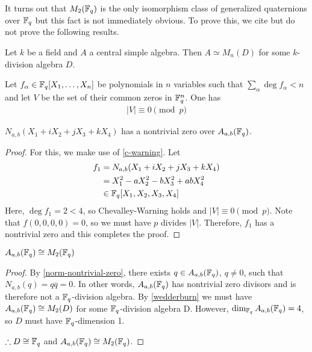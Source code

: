 \documentclass{amsart}
\begin{document}
It turns out that $M_2(\protect\mathbb{F}_q)$ is the only isomorphism class of generalized quaternions over $\protect\mathbb{F}_q$ but this fact is not immediately obvious. To prove this, we cite but do not prove the following results. 

\begin{theorem}\label{wedderburn}
    Let $k$ be a field and $A$ a central simple algebra. Then $A \simeq M_n(D)$ for some $k$-division algebra $D$.
\end{theorem}

\begin{theorem}\label{c-warning}
    Let $f_{\alpha} \in \protect\mathbb{F}_q[X_1, \dots, X_n]$ be polynomials in $n$ variables such that $\sum_{\alpha} \deg f_{\alpha} < n$ and let $V$ be the set of their common zeros in $\protect\mathbb{F}_q^n$. One has 
    \begin{align*}
        | V | \equiv 0 \pmod{p}
    \end{align*}
\end{theorem}

\begin{lemma}\label{norm-nontrivial-zero}
    $N_{a,b}(X_1 + iX_2 + jX_3 + kX_4)$ has a nontrivial zero over $A_{a,b}(\protect\mathbb{F}_q)$.
\end{lemma}
\begin{proof}
    For this, we make use of \cref{c-warning}. Let 
    \begin{align*}
        f_1 &= N_{a,b}(X_1 + iX_2 + jX_3 + kX_4) \\
            &= X_1^2 -aX_2^2 -bX_3^2 + abX_4^2 \\
            &\in \protect\mathbb{F}_q[X_1, X_2, X_3, X_4]
    \end{align*}
    Here, $\deg f_1 = 2 < 4$, so Chevalley-Warning holds and $|V| \equiv 0 \pmod{p}$. Note that $f(0,0,0,0) = 0$, so we must have $p$ divides $|V|$. Therefore, $f_1$ has a nontrivial zero and this completes the proof.
\end{proof}

\begin{theorem}
    $A_{a,b}(\protect\mathbb{F}_q) \cong M_2(\protect\mathbb{F}_q)$ 
\end{theorem}
\begin{proof}
    By \cref{norm-nontrivial-zero}, there exists $q \in A_{a,b}(\protect\mathbb{F}_q)$, $q \neq 0$, such that $N_{a,b}(q) = q \overline{q} = 0$. In other words, $A_{a,b}(\protect\mathbb{F}_q)$ has nontrivial zero divisors and is therefore not a $\protect\mathbb{F}_q$-division algebra. By \cref{wedderburn} we must have $A_{a,b}(\protect\mathbb{F}_q) \cong M_2(D)$ for some $\protect\mathbb{F}_q$-division algebra D. However, $\dim_{\protect\mathbb{F}_q} A_{a,b}(\protect\mathbb{F}_q) = 4$, so $D$ must have $\protect\mathbb{F}_q$-dimension 1.

    $\therefore D \cong \protect\mathbb{F}_q$ and $A_{a,b}(\protect\mathbb{F}_q) \cong M_2(\protect\mathbb{F}_q)$. 
\end{proof}
\end{document}
